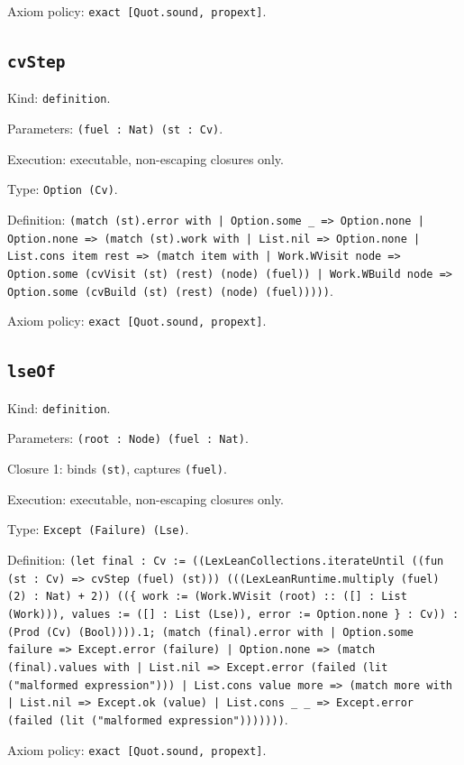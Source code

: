 \documentclass[11pt]{article}
\begin{document}
\noindent Axiom policy: \texttt{exact [Quot.sound, propext]}.\par
\subsection*{\texttt{cvStep}}
\noindent Kind: \texttt{definition}.\par
\noindent Parameters: \texttt{(fuel : Nat) (st : Cv)}.\par
\noindent Execution: executable, non-escaping closures only.\par
\noindent Type: \texttt{Option (Cv)}.\par
\noindent Definition: \texttt{(match (st).error with | Option.some \_ => Option.none | Option.none => (match (st).work with | List.nil => Option.none | List.cons item rest => (match item with | Work.WVisit node => Option.some (cvVisit (st) (rest) (node) (fuel)) | Work.WBuild node => Option.some (cvBuild (st) (rest) (node) (fuel)))))}.\par
\noindent Axiom policy: \texttt{exact [Quot.sound, propext]}.\par
\subsection*{\texttt{lseOf}}
\noindent Kind: \texttt{definition}.\par
\noindent Parameters: \texttt{(root : Node) (fuel : Nat)}.\par
\noindent Closure 1: binds \texttt{(st)}, captures \texttt{(fuel)}.\par
\noindent Execution: executable, non-escaping closures only.\par
\noindent Type: \texttt{Except (Failure) (Lse)}.\par
\noindent Definition: \texttt{(let final : Cv := ((LexLeanCollections.iterateUntil ((fun (st : Cv) => cvStep (fuel) (st))) (((LexLeanRuntime.multiply (fuel) (2) : Nat) + 2)) ((\{ work := (Work.WVisit (root) :: ([] : List (Work))), values := ([] : List (Lse)), error := Option.none \} : Cv)) : (Prod (Cv) (Bool)))).1; (match (final).error with | Option.some failure => Except.error (failure) | Option.none => (match (final).values with | List.nil => Except.error (failed (lit ("malformed expression"))) | List.cons value more => (match more with | List.nil => Except.ok (value) | List.cons \_ \_ => Except.error (failed (lit ("malformed expression")))))))}.\par
\noindent Axiom policy: \texttt{exact [Quot.sound, propext]}.\par
\end{document}

